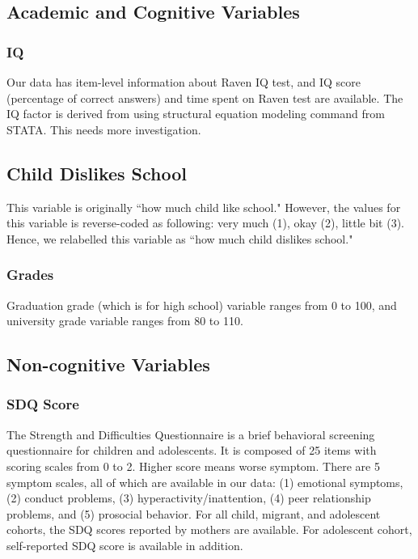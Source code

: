 \documentclass[12pt]{article}
\begin{document}
\subsection{Academic and Cognitive Variables}

\subsubsection{IQ} 
Our data has item-level information about Raven IQ test, and IQ score (percentage of correct answers) and time spent on Raven test are available. The IQ factor is derived from using structural equation modeling command from STATA. This needs more investigation. 

\subsection{Child Dislikes School} 
This variable is originally ``how much child like school." However, the values for this variable is reverse-coded as following: very much (1), okay (2), little bit (3). Hence, we relabelled this variable as ``how much child dislikes school."

\subsubsection{Grades} 
Graduation grade (which is for high school) variable ranges from 0 to 100, and university grade variable ranges from 80 to 110.

\subsection{Non-cognitive Variables}

\subsubsection{SDQ Score} 
The Strength and Difficulties Questionnaire is a brief behavioral screening questionnaire for children and adolescents. It is composed of 25 items with scoring scales from 0 to 2. Higher score means worse symptom. There are 5 symptom scales, all of which are available in our data: (1) emotional symptoms, (2) conduct problems, (3) hyperactivity/inattention, (4) peer relationship problems, and (5) prosocial behavior. For all child, migrant, and adolescent cohorts, the SDQ scores reported by mothers are available. For adolescent cohort, self-reported SDQ score is available in addition.
\end{document}
